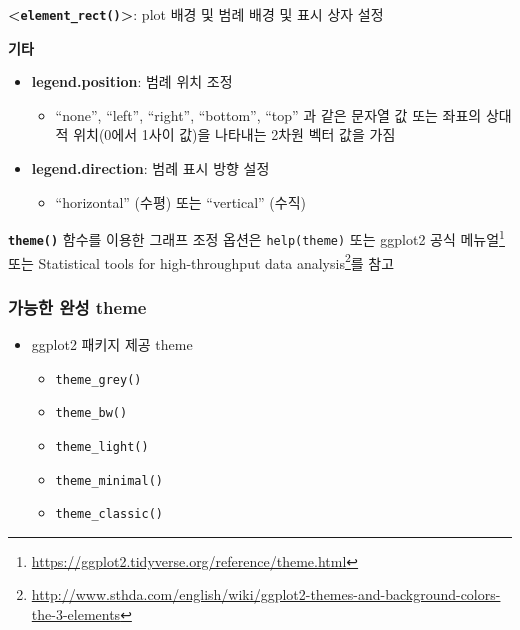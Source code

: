 \documentclass[
  11pt,
]{krantz}
\makeatletter
\providecommand{\tightlist}{%
  \setlength{\itemsep}{0pt}\setlength{\parskip}{0pt}}
\renewcommand{\href}[2]{#2\footnote{\url{#1}}}
\newenvironment{kframe}{%
\medskip{}
\setlength{\fboxsep}{.8em}
 \def\at@end@of@kframe{}%
 \ifinner\ifhmode%
  \def\at@end@of@kframe{\end{minipage}}%
  \begin{minipage}{\columnwidth}%
 \fi\fi%
 \def\FrameCommand##1{\hskip\@totalleftmargin \hskip-\fboxsep
 \colorbox{shadecolor}{##1}\hskip-\fboxsep
     \hskip-\linewidth \hskip-\@totalleftmargin \hskip\columnwidth}%
 \MakeFramed {\advance\hsize-\width
   \@totalleftmargin\z@ \linewidth\hsize
   \@setminipage}}%
 {\par\unskip\endMakeFramed%
 \at@end@of@kframe}
\newenvironment{rmdblock}[1]
  {
  \begin{itemize}
  \renewcommand{\labelitemi}{
    \raisebox{-.7\height}[0pt][0pt]{
      {\setkeys{Gin}{width=3em,keepaspectratio}\texttt{[image: images/\#1]}}
    }
  }
  \setlength{\fboxsep}{1em}
  \begin{kframe}
  \item
  }
  {
  \end{kframe}
  \end{itemize}
  }
\newenvironment{rmdnote}
  {\begin{rmdblock}{note}}
  {\end{rmdblock}}
\makeatother
\begin{document}
\textbf{\textless{}\texttt{element\_rect()}\textgreater{}}: plot 배경 및 범례 배경 및 표시 상자 설정

\textbf{기타}

\begin{itemize}
\tightlist
\item
  \textbf{legend.position}: 범례 위치 조정

  \begin{itemize}
  \tightlist
  \item
    ``none'', ``left'', ``right'', ``bottom'', ``top'' 과 같은 문자열 값 또는 좌표의 상대적 위치(0에서 1사이 값)을 나타내는 2차원 벡터 값을 가짐
  \end{itemize}
\item
  \textbf{legend.direction}: 범례 표시 방향 설정

  \begin{itemize}
  \tightlist
  \item
    ``horizontal'' (수평) 또는 ``vertical'' (수직)
  \end{itemize}
\end{itemize}

\footnotesize

\begin{rmdnote}
\begin{rmdnote}

\textbf{\texttt{theme()}} 함수를 이용한 그래프 조정 옵션은 \texttt{help(theme)} 또는 \href{https://ggplot2.tidyverse.org/reference/theme.html}{ggplot2 공식 메뉴얼} 또는 \href{http://www.sthda.com/english/wiki/ggplot2-themes-and-background-colors-the-3-elements}{Statistical tools for high-throughput data analysis}를 참고

\end{rmdnote}
\end{rmdnote}

\normalsize

\hypertarget{theme-complete}{%
\subsubsection*{가능한 완성 theme}\label{theme-complete}}


\begin{itemize}
\tightlist
\item
  ggplot2 패키지 제공 theme

  \begin{itemize}
  \tightlist
  \item
    \texttt{theme\_grey()}
  \item
    \texttt{theme\_bw()}
  \item
    \texttt{theme\_light()}
  \item
    \texttt{theme\_minimal()}
  \item
    \texttt{theme\_classic()}
  \end{itemize}
\end{itemize}
\end{document}
